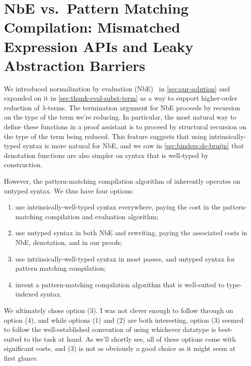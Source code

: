 \section{NbE vs.~Pattern Matching Compilation: Mismatched Expression APIs and Leaky Abstraction Barriers}\label{sec:rewriting-more:AST:choices}
We introduced normalization by evaluation (NbE)~\cite{NbE} in \autoref{sec:our-solution} and expanded on it in \autoref{sec:thunk-eval-subst-term} as a way to support higher-order reduction of $\lambda$-terms.
The termination argument for NbE proceeds by recursion on the type of the term we're reducing.
In particular, the most natural way to define these functions in a proof assistant is to proceed by structural recursion on the type of the term being reduced.
This feature suggests that using intrinsically-typed syntax is more natural for NbE, and we saw in \autoref{sec:binders:de-bruijn} that denotation functions are also simpler on syntax that is well-typed by construction.

However, the pattern-matching compilation algorithm of \textcite{maranget2008compiling} inherently operates on untyped syntax.
We thus have four options:
\begin{enumerate}[(1)]
\item
  use intrinsically-well-typed syntax everywhere, paying the cost in the pattern-matching compilation and evaluation algorithm;
\item
  use untyped syntax in both NbE and rewriting, paying the associated costs in NbE, denotation, and in our proofs;
\item
  use intrinsically-well-typed syntax in most passes, and untyped syntax for pattern matching compilation;
\item
  invent a pattern-matching compilation algorithm that is well-suited to type-indexed syntax.
\end{enumerate}
We ultimately chose option (3).
I was not clever enough to follow through on option (4), and while options (1) and (2) are both interesting, option (3) seemed to follow the well-established convention of using whichever datatype is best-suited to the task at hand.
As we'll shortly see, all of these options come with significant costs, and (3) is not as obviously a good choice as it might seem at first glance.

